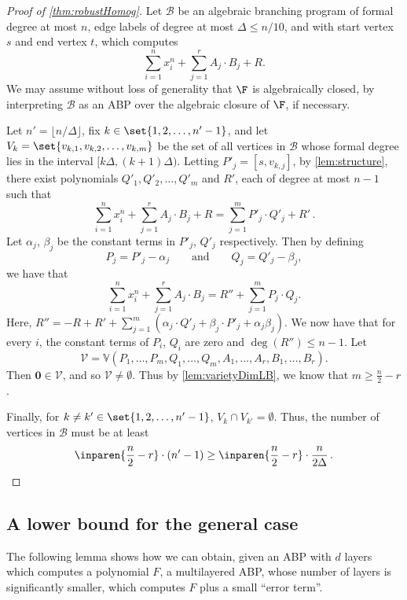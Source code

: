 \begin{proof}[Proof of \autoref{thm:robustHomog}]
	Let $\mathcal{B}$ be an algebraic branching program of formal degree at most $n$, edge labels of degree at most $\Delta \le n/10$, and with start vertex $s$ and end vertex $t$, which computes
	\[\sum_{i = 1}^n x_i^n + \sum_{j = 1}^r A_j\cdot B_j + R.\]
	We may assume without loss of generality that $\F$ is algebraically closed, by interpreting $\mathcal{B}$ as an ABP over the algebraic closure of $\F$, if necessary.
		
	Let $n' = \lfloor n/\Delta \rfloor$, fix $k \in \set{1, 2, \ldots ,n'-1}$, and let $V_k = \set{v_{k,1}, v_{k,2}, \ldots, v_{k,m}}$ be the set of all vertices in $\mathcal{B}$ whose formal degree lies in the interval $[k\Delta, (k+1)\Delta)$.  Letting $P'_j = [s,v_{k,j}]$, by \autoref{lem:structure}, there exist polynomials $Q'_1, Q'_2, \ldots, Q'_m$ and $R'$, each of degree at most $n-1$ such that
	\[
		\sum_{i = 1}^n x_i^n + \sum_{j = 1}^r A_j\cdot B_j + R = \sum_{j=1}^{m} P'_j \cdot Q'_j + R'\, .
	\]
	Let $\alpha_j$, $\beta_j$ be the constant terms in $P'_j$, $Q'_j$ respectively. Then by defining
	\[P_j = P'_j - \alpha_j \qquad \text{and} \qquad Q_j = Q'_j - \beta_j,\]
	we have that
	\[
		\sum_{i=1}^{n} x_i^n + \sum_{j=1}^{r} A_j \cdot B_j = R'' + \sum_{j=1}^{m} P_j \cdot Q_j.
	\]
	Here, $R'' = -R + R' + \sum_{j=1}^{m} (\alpha_j \cdot Q'_j + \beta_j \cdot P'_j + \alpha_j \beta_j)$. We now have that for every $i$, the constant terms of $P_i$, $Q_i$ are zero and $\deg(R'') \leq n-1$.
	Let 
	\[
		\mathcal{V} = \mathbb{V}(P_1, \ldots, P_m, Q_1, \ldots, Q_m, A_1, \ldots, A_r, B_1, \ldots, B_r).
	\]
	Then $\mathbf{0} \in \mathcal{V}$, and so $\mathcal{V} \neq \emptyset$. Thus by \autoref{lem:varietyDimLB}, we know that $m \geq \frac{n}{2} - r$.
		
	Finally, for $ k\neq k' \in \set{1, 2, \ldots, n'-1}$, $V_k \cap V_{k'} = \emptyset$. Thus, the number of vertices in $\mathcal{B}$ must be at least
	\[
		\inparen{\dfrac{n}{2} - r} \cdot (n'-1) \geq \inparen{\frac{n}{2} - r}\cdot  \frac{n}{2\Delta}\,.
		\qedhere
	\]
\end{proof}
	

\subsection{A lower bound for the general case}

The following lemma shows how we can obtain, given an ABP with $d$ layers which computes a polynomial $F$, a multilayered ABP, whose number of layers is significantly smaller, which computes $F$ plus a small ``error term''.
	
